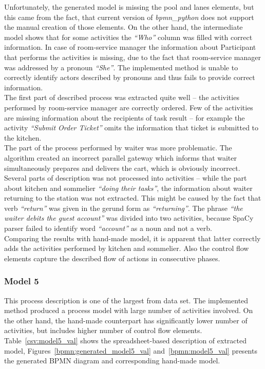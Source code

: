 Unfortunately, the generated model is missing the pool and lanes elements, but this came from the fact, that current version of \emph{bpmn\_python} does not support the manual creation of those elements. On the other hand, the intermediate model shows that for some activities the \emph{``Who''} column was filled with correct information. In case of room-service manager the information about Participant that performs the activities is missing, due to the fact that room-service manager was addressed by a pronoun \emph{``She''}. The implemented method is unable to correctly identify actors described by pronouns and thus fails to provide correct information.\\
The first part of described process was extracted quite well -- the activities performed by room-service manager are correctly ordered. Few of the activities are missing information about the recipients of task result -- for example the activity \emph{``Submit Order Ticket''} omits the information that ticket is submitted to the kitchen.\\
The part of the process performed by waiter was more problematic. The algorithm created an incorrect parallel gateway which informs that waiter simultaneously prepares and delivers the cart, which is obviously incorrect. Several parts of description was not processed into activities -- while the part about kitchen and sommelier \emph{``doing their tasks''}, the information about waiter returning to the station was not extracted. This might be caused by the fact that verb \emph{``return''} was given in the gerund form as \emph{``returning''}. The phrase \emph{``the waiter debits the guest account''} was divided into two activities, because SpaCy parser failed to identify word \emph{``account''} as a noun and not a verb.\\
Comparing the results with hand-made model, it is apparent that latter correctly adds the activities performed by kitchen and sommelier. Also the control flow elements capture the described flow of actions in consecutive phases.

\subsubsection{Model 5}
\begin{tcolorbox}[
	breakable,
	arc=0mm,
	left=1pt,
	right = 1pt,
	boxrule=0mm,
	colback = {white},
	]
	\texttt{}
\end{tcolorbox}
\label{txt:model5_val}
This process description is one of the largest from data set. The implemented method produced a process model with large number of activities involved. On the other hand, the hand-made counterpart has significantly lower number of activities, but includes higher number of control flow elements. Table~\ref{csv:model5_val} shows the spreadsheet-based description of extracted model, Figures~\ref{bpmn:generated_model5_val} and~\ref{bpmn:model5_val} presents the generated BPMN diagram and corresponding hand-made model.

